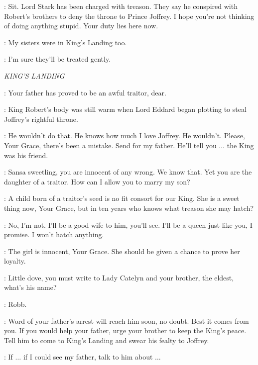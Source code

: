 \JEOR: Sit. Lord Stark has been charged with treason. They say he conspired with Robert's brothers to deny the throne to Prince Joffrey.  I hope you're not thinking of doing anything stupid. Your duty lies here now. 

\JON: My sisters were in King's Landing too. 

\JEOR: I'm sure they'll be treated gently. 


\scene

\textit{KING'S LANDING} 


\VARYS: Your father has proved to be an awful traitor, dear.

\PYCELLE: King Robert's body was still warm when Lord Eddard began plotting to steal Joffrey's rightful throne. 

\SANSA: He wouldn't do that. He knows how much I love Joffrey. He wouldn't. Please, Your Grace, there's been a mistake. Send for my father. He'll tell you $\ldots$ the King was his friend. 

\CERSEI: Sansa sweetling, you are innocent of any wrong. We know that. Yet you are the daughter of a traitor. How can I allow you to marry my son? 

\PYCELLE: A child born of a traitor's seed is no fit consort for our King. She is a sweet thing now, Your Grace, but in ten years who knows what treason she may hatch? 

\SANSA: No, I'm not. I'll be a good wife to him, you'll see. I'll be a queen just like you, I promise. I won't hatch anything. 

\LITTLEFINGER: The girl is innocent, Your Grace. She should be given a chance to prove her loyalty. 

\CERSEI: Little dove, you must write to Lady Catelyn and your brother, the eldest, what's his name?


\SANSA: Robb. 

\CERSEI: Word of your father's arrest will reach him soon, no doubt. Best it comes from you. If you would help your father, urge your brother to keep the King's peace.  Tell him to come to King's Landing and swear his fealty to Joffrey. 

\SANSA: If $\ldots$ if I could see my father, talk to him about $\ldots$  

